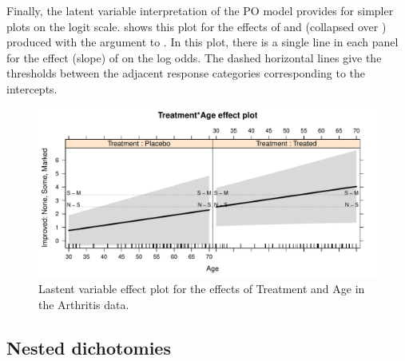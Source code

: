 \documentclass[11pt]{book}
\renewenvironment{knitrout}{\small\renewcommand{\baselinestretch}{.85}}{} %
\begin{document}
Finally, the latent variable interpretation of the PO model provides for simpler plots on the
logit scale.   shows this plot for the effects of 
 and  (collapsed over )
produced with the argument
 to .  In this plot, there is a single line in each panel
for the effect (slope) of  on the log odds.  The dashed horizontal lines
give the thresholds between the adjacent response categories corresponding to the
intercepts.
\begin{knitrout}
\color{fgcolor}\begin{kframe}
\begin{alltt}
\hlstd{(}\hlstd{(}\hlstd{(}\hlstd{,}  \hlstd{=}\hlstd{),} \hlstd{=}\hlstd{)}
\end{alltt}
\end{kframe}\begin{figure}[!htbp]


\centerline{\includegraphics[width=.9\textwidth]{ch07/fig/arth-po-eff3} }

\caption[Lastent variable effect plot for the effects of Treatment and Age in the Arthritis data]{Lastent variable effect plot for the effects of Treatment and Age in the Arthritis data.\label{fig:arth-po-eff3}}
\end{figure}


\end{knitrout}



\subsection{Nested dichotomies}\label{sec:nested}
\end{document}
